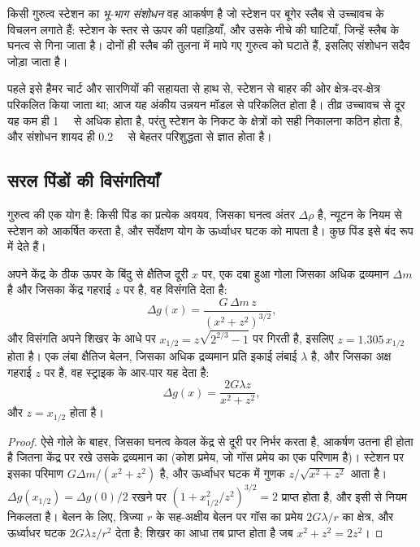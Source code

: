 \begin{definition}[भू-भाग संशोधन]\label{def:b3:field-lab-methods-3:terrain}
किसी गुरुत्व स्टेशन का \emph{भू-भाग संशोधन} वह आकर्षण है जो
स्टेशन पर बूगेर स्लैब से उच्चावच के विचलन लगाते हैं:
स्टेशन के स्तर से ऊपर की पहाड़ियाँ, और उसके नीचे की घाटियाँ,
जिन्हें स्लैब के घनत्व से गिना जाता है। दोनों ही स्लैब की तुलना में
मापे गए गुरुत्व को घटाते हैं, इसलिए संशोधन
सदैव जोड़ा जाता है।
\end{definition}

पहले इसे हैमर चार्ट और सारणियों की सहायता से हाथ से,
स्टेशन से बाहर की ओर क्षेत्र-दर-क्षेत्र परिकलित किया जाता था; आज यह अंकीय उन्नयन
मॉडल से परिकलित होता है। तीव्र उच्चावच से दूर यह कम ही \qty{1}{\milli\gal} से अधिक होता है,
परंतु स्टेशन के निकट के क्षेत्रों को सही निकालना कठिन होता है, और
संशोधन शायद ही \qty{0.2}{\milli\gal} से बेहतर परिशुद्धता से ज्ञात होता है।

\subsection{सरल पिंडों की विसंगतियाँ}

गुरुत्व की  एक योग है: किसी पिंड का प्रत्येक अवयव, जिसका
घनत्व अंतर $\Delta\rho$ है, न्यूटन के नियम से स्टेशन को आकर्षित करता है, और
सर्वेक्षण योग के ऊर्ध्वाधर घटक को मापता है। कुछ पिंड इसे
बंद रूप में देते हैं।

\begin{theorem}[गोला और क्षैतिज बेलन]\label{thm:b3:field-lab-methods-3:sphere}
अपने केंद्र के ठीक ऊपर के बिंदु से क्षैतिज दूरी $x$ पर, एक दबा हुआ गोला
जिसका अधिक द्रव्यमान $\Delta m$ है और जिसका केंद्र गहराई $z$ पर है, वह
विसंगति देता है:
\[
\Delta g(x) = \frac{G\,\Delta m\,z}{(x^2 + z^2)^{3/2}} ,
\]
और विसंगति अपने शिखर के आधे पर $x_{1/2} = z\sqrt{2^{2/3} - 1}$ पर गिरती है,
इसलिए $z = 1.305\,x_{1/2}$ होता है। एक लंबा क्षैतिज बेलन, जिसका अधिक द्रव्यमान
प्रति इकाई लंबाई $\lambda$ है, और जिसका अक्ष गहराई $z$ पर है, वह
स्ट्राइक के आर-पार यह देता है:
\[
\Delta g(x) = \frac{2G\lambda z}{x^2 + z^2} ,
\]
और $z = x_{1/2}$ होता है।
\end{theorem}

\begin{proof}
ऐसे गोले के बाहर, जिसका घनत्व केवल केंद्र से दूरी पर निर्भर करता है,
आकर्षण उतना ही होता है जितना केंद्र पर रखे उसके द्रव्यमान का (कोश प्रमेय,
जो गॉस प्रमेय का एक परिणाम है)। स्टेशन पर इसका परिमाण
$G\Delta m/(x^2 + z^2)$ है, और ऊर्ध्वाधर घटक में गुणक
$z/\sqrt{x^2 + z^2}$ आता है। $\Delta g(x_{1/2}) =
\Delta g(0)/2$ रखने पर $(1 + x_{1/2}^2/z^2)^{3/2} = 2$ प्राप्त होता है, और इसी से नियम निकलता है। बेलन के लिए,
त्रिज्या $r$ के सह-अक्षीय बेलन पर गॉस का प्रमेय
$2G\lambda/r$ का क्षेत्र, और ऊर्ध्वाधर घटक $2G\lambda z/r^2$ देता है;
शिखर का आधा तब प्राप्त होता है जब $x^2 + z^2 = 2z^2$।
\end{proof}

